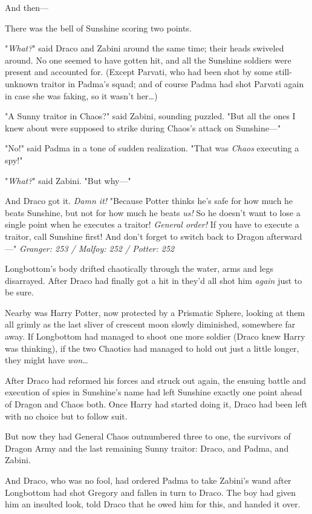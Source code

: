 And then---

There was the bell of Sunshine scoring two points.

"\emph{What?}" said Draco and Zabini around the same time; their heads swiveled 
around. No one seemed to have gotten hit, and all the Sunshine soldiers were 
present and accounted for. (Except Parvati, who had been shot by some 
still-unknown traitor in Padma's squad; and of course Padma had shot Parvati 
again in case she was faking, so it wasn't her{\ldots})

"A Sunny traitor in Chaos?" said Zabini, sounding puzzled. "But all the ones I 
knew about were supposed to strike during Chaos's attack on Sunshine---"

"No!" said Padma in a tone of sudden realization. "That was \emph{Chaos} 
executing a spy!"

"\emph{What?}" said Zabini. "But why---"

And Draco got it. \emph{Damn it!} "Because Potter thinks he's safe for how much 
he beats Sunshine, but not for how much he beats \emph{us!} So he doesn't want 
to lose a single point when he executes a traitor! \emph{General order!} If you 
have to execute a traitor, call Sunshine first! And don't forget to switch back 
to Dragon afterward---"
\sbreak
\emph{Granger: 253 / Malfoy: 252 / Potter: 252}

Longbottom's body drifted chaotically through the water, arms and legs 
disarrayed. After Draco had finally got a hit in they'd all shot him 
\emph{again} just to be sure.

Nearby was Harry Potter, now protected by a Prismatic Sphere, looking at them 
all grimly as the last sliver of crescent moon slowly diminished, somewhere far 
away. If Longbottom had managed to shoot one more soldier (Draco knew Harry was 
thinking), if the two Chaotics had managed to hold out just a little longer, 
they might have \emph{won}{\ldots}

After Draco had reformed his forces and struck out again, the ensuing battle 
and execution of spies in Sunshine's name had left Sunshine exactly one point 
ahead of Dragon and Chaos both. Once Harry had started doing it, Draco had been 
left with no choice but to follow suit.

But now they had General Chaos outnumbered three to one, the survivors of 
Dragon Army and the last remaining Sunny traitor: Draco, and Padma, and Zabini.

And Draco, who was no fool, had ordered Padma to take Zabini's wand after 
Longbottom had shot Gregory and fallen in turn to Draco. The boy had given him 
an insulted look, told Draco that he owed him for this, and handed it over.

